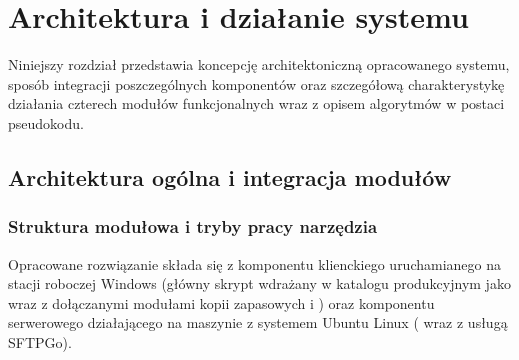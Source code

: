 \chapter{Architektura i działanie systemu}\label{ch:architektura-i-dzialanie}

Niniejszy rozdział przedstawia koncepcję architektoniczną opracowanego systemu, sposób integracji poszczególnych komponentów oraz szczegółową charakterystykę działania czterech modułów funkcjonalnych wraz z opisem algorytmów w postaci pseudokodu.

\section{Architektura ogólna i integracja modułów}\label{sec:architektura-narzedzia}

\subsection{Struktura modułowa i tryby pracy narzędzia}\label{subsec:struktura-modulowa-cli}

Opracowane rozwiązanie składa się z komponentu klienckiego uruchamianego na stacji roboczej Windows (główny skrypt  wdrażany w katalogu produkcyjnym jako  wraz z dołączanymi modułami kopii zapasowych  i ) oraz komponentu serwerowego działającego na maszynie z systemem Ubuntu Linux ( wraz z usługą SFTPGo).

